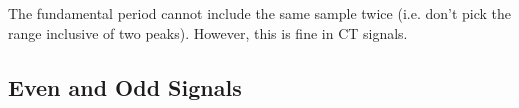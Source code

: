     \begin{example}
    \end{example}

    \begin{warning}
        The fundamental period cannot include the same sample twice (i.e. don't pick the range inclusive of two peaks). However, this is fine in CT signals.
    \end{warning}

\subsection{Even and Odd Signals}
    

